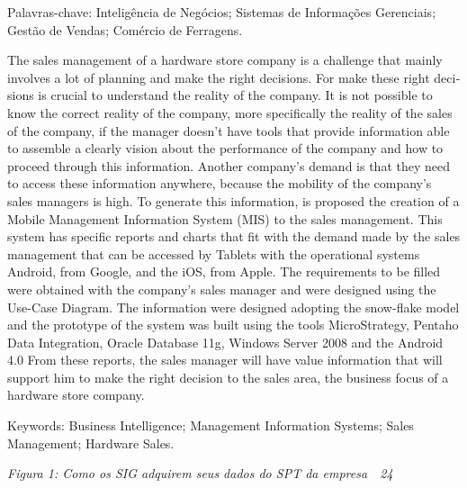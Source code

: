 \documentclass[a4paper]{article}
\begin{document}
\bigskip

{\sffamily
Palavras-chave: Intelig\^encia de Neg\'ocios; Sistemas de Informa\c{c}\~oes Gerenciais; Gest\~ao de Vendas; Com\'ercio
de Ferragens.}



\bigskip

{
\foreignlanguage{english}{\textsf{The sales management of a hardware store company is a challenge that mainly involves a
lot of planning and make the right decisions. For make these right decisions is crucial to understand the reality of
the company. It is not possible to know the correct reality of the company, more specifically the reality of the sales
of the company, if the manager doesn't have tools that provide information able to assemble a clearly vision about the
performance of the company and how to proceed through this information. Another company's demand is that they need to
access these information anywhere, because the mobility of the company's sales managers is high. To generate this
information, is proposed the creation of a Mobile Management Information System (MIS) to the sales management. This
system has specific reports and charts that fit with the demand made by the sales management that can be accessed by
Tablets with the operational systems Android, from Google, and the iOS, from Apple. The requirements to be filled were
obtained with the company's sales manager and were designed using the Use-Case Diagram. The information were designed
adopting the snow-flake model and the prototype of the system was built using the tools MicroStrategy, Pentaho Data
Integration, Oracle Database 11g, Windows Server 2008 and the Android 4.0 From these reports, the sales manager will
have value information that will support him to make the right decision to the sales area, the business focus of a
hardware store company. }}}


\bigskip

{
\foreignlanguage{english}{\textsf{Keywords: Business Intelligence; Management Information Systems; Sales Management;
Hardware Sales.}}}



\bigskip

{\sffamily\itshape
\textup{Figura 1: Como os SIG adquirem seus dados do SPT da empresa\ \ 24}}
\end{document}
